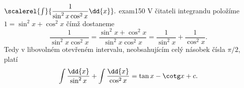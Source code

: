 \begin{mathexam}{\(\protect\scalerel{\int}{\dfrac{1}{\sin^2x\cos^2x}\dd{x}}.\)
  \hfill\cite[s.~31]{Knichal}}{exam150} 
  V čitateli integrandu položíme \(1=\sin^2x +\cos^2x\) čímž dostaneme
  \[\dfrac{1}{\sin^2x\cos^2x} = \dfrac{\sin^2x +\cos^2x}{\sin^2x\cos^2x} 
                              = \dfrac{1}{\sin^2x} + \dfrac{1}{\cos^2x}.\]
  Tedy v libovolném otevřeném intervalu, neobsahujícím celý násobek čísla \(\pi/2\), platí
  \begin{equation*}
    \int\dfrac{\dd{x}}{\sin^2x} + \int\dfrac{\dd{x}}{\cos^2x} = \tan x - \cotg x + c.
  \end{equation*}
\end{mathexam}